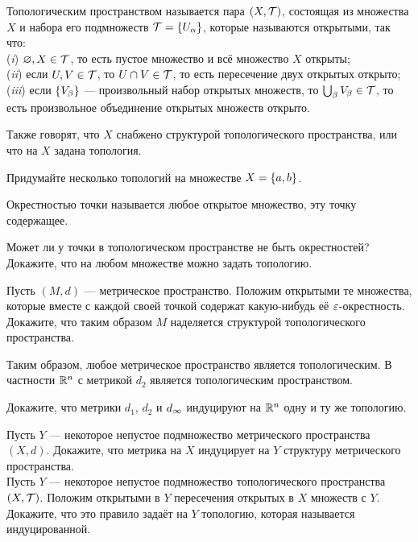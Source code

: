 \documentclass[a4paper,10pt]{article}
\begin{document}

    Топологическим пространством называется пара $(X,\mathcal{T})$, состоящая из множества $X$ и набора его подмножеств $\mathcal{T}=\left\{U_\alpha\right\}$, которые называются  открытыми, так что:\\
    ({\it i\/}) $\varnothing,X\in\mathcal{T}$, то есть пустое множество и всё множество $X$ открыты;\\
    ({\it ii\/}) если $U,V\in\mathcal{T}$, то $U\cap V\in\mathcal{T}$, то есть пересечение двух открытых открыто;\\
    ({\it iii\/}) если $\left\{V_\beta\right\}$ --- произвольный набор открытых множеств, то $\bigcup_\beta V_\beta\in\mathcal{T}$, то есть произвольное объединение открытых множеств открыто.

    Также говорят, что $X$ снабжено структурой топологического пространства, или что на $X$ задана топология.


    Придумайте несколько топологий на множестве $X=\left\{a,b\right\}$.

     Окрестностью точки называется любое открытое множество, эту точку содержащее.

    Может ли у точки в топологическом пространстве не быть окрестностей?\\
    Докажите, что на любом множестве можно задать топологию.


    Пусть $(M,d)$ --- метрическое пространство. Положим открытыми те множества, которые вместе с каждой своей точкой содержат какую-нибудь её $\varepsilon$-окрестность. Докажите, что таким образом  $M$ наделяется структурой топологического пространства.

Таким образом, любое метрическое пространство является топологическим. В частности $\mathbb{R}^n$ с метрикой $d_2$ является топологическим пространством.

    Докажите, что метрики $d_1$, $d_2$ и $d_\infty$ индуцируют на $\mathbb{R}^n$ одну и ту же топологию.


    Пусть $Y$ --- некоторое непустое подмножество метрического пространства $(X,d)$. Докажите, что метрика на $X$ индуцирует на $Y$ структуру метрического пространства.\\
    Пусть $Y$ --- некоторое непустое подмножество топологического пространства $(X,\mathcal{T})$. Положим открытыми в $Y$ пересечения открытых в $X$ множеств с $Y$. Докажите, что это правило задаёт на $Y$ топологию, которая называется  индуцированной.
\end{document}
